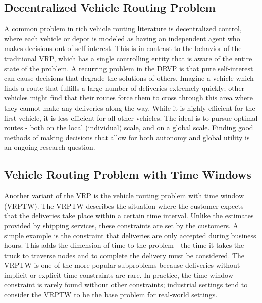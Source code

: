 \documentclass{sig-alternate}
\begin{document}
\subsection{Decentralized Vehicle Routing Problem}
A common problem in rich vehicle routing literature is decentralized control, where each vehicle or depot is modeled as having an independent agent who makes decisions out of self-interest. This is in contrast to the behavior of the traditional VRP, which has a single controlling entity that is aware of the entire state of the problem. A recurring problem in the DRVP is that pure self-interest can cause decisions that degrade the solutions of others. Imagine a vehicle which finds a route that fulfills a large number of deliveries extremely quickly; other vehicles might find that their routes force them to cross through this area where they cannot make any deliveries along the way. While it is highly efficient for the first vehicle, it is less efficient for all other vehicles. The ideal is to pursue optimal routes - both on the local (individual) scale, and on a global scale. Finding good methods of making decisions that allow for both autonomy and global utility is an ongoing research question. 
\subsection{Vehicle Routing Problem with Time Windows}
Another variant of the VRP is the vehicle routing problem with time window (VRPTW). The VRPTW describes the situation where the customer expects that the deliveries take place within a certain time interval. Unlike the estimates provided by shipping services, these constraints are set by the customers. A simple example is the constraint that deliveries are only accepted during business hours. This adds the dimension of time to the problem - the time it takes the truck to traverse nodes and to complete the delivery must be considered. The VRPTW is one of the more popular subproblems because deliveries without implicit or explicit time constraints are rare. In practice, the time window constraint is rarely found without other constraints; industrial settings tend to consider the VRPTW to be the base problem for real-world settings. 
\end{document}
